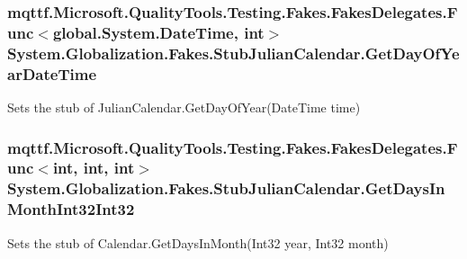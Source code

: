 \hypertarget{class_system_1_1_globalization_1_1_fakes_1_1_stub_julian_calendar_a5a3f102ebb1185c7887758fd3be43321}{
\subsubsection[{Get\-Day\-Of\-Year\-Date\-Time}]{\setlength{\rightskip}{0pt plus 5cm}mqttf.\-Microsoft.\-Quality\-Tools.\-Testing.\-Fakes.\-Fakes\-Delegates.\-Func$<$global.\-System.\-Date\-Time, int$>$ System.\-Globalization.\-Fakes.\-Stub\-Julian\-Calendar.\-Get\-Day\-Of\-Year\-Date\-Time}}\label{class_system_1_1_globalization_1_1_fakes_1_1_stub_julian_calendar_a5a3f102ebb1185c7887758fd3be43321}


Sets the stub of Julian\-Calendar.\-Get\-Day\-Of\-Year(\-Date\-Time time)

\hypertarget{class_system_1_1_globalization_1_1_fakes_1_1_stub_julian_calendar_a130fcfbf42da71b4e86b65d844c65643}{
\subsubsection[{Get\-Days\-In\-Month\-Int32\-Int32}]{\setlength{\rightskip}{0pt plus 5cm}mqttf.\-Microsoft.\-Quality\-Tools.\-Testing.\-Fakes.\-Fakes\-Delegates.\-Func$<$int, int, int$>$ System.\-Globalization.\-Fakes.\-Stub\-Julian\-Calendar.\-Get\-Days\-In\-Month\-Int32\-Int32}}\label{class_system_1_1_globalization_1_1_fakes_1_1_stub_julian_calendar_a130fcfbf42da71b4e86b65d844c65643}


Sets the stub of Calendar.\-Get\-Days\-In\-Month(\-Int32 year, Int32 month)

